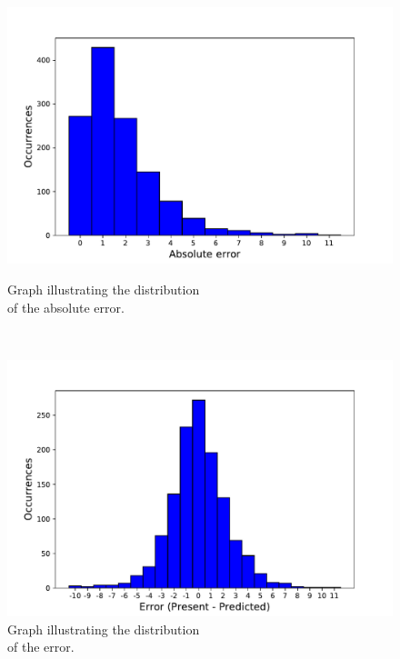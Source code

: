 
\begin{figure}[H]
\begin{minipage}[b]{8.5cm}
\centering
\includegraphics[width=1\textwidth]{images/absoluteerror}
\caption{Graph illustrating the distribution\\of the absolute error.}
\label{fig:absoluteerror}
\end{minipage}
\ \hspace{2mm} \
\begin{minipage}[b]{8.5cm}
\centering
\includegraphics[width=1\textwidth]{images/errorpres}
\caption{Graph illustrating the distribution\\of the error.}
\label{fig:errorpres}
\end{minipage}
\end{figure}

